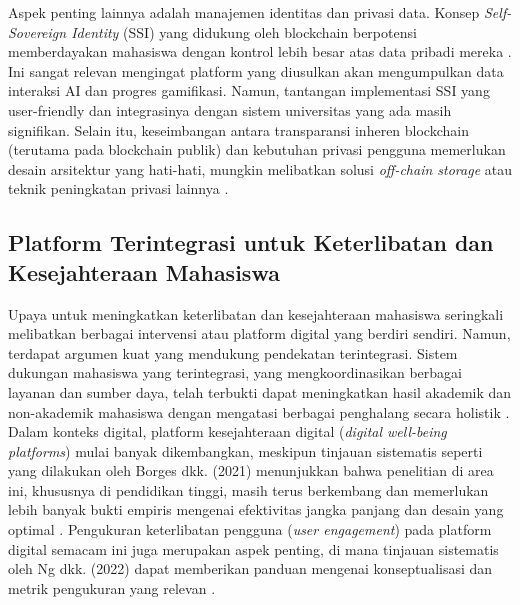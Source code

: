 Aspek penting lainnya adalah manajemen identitas dan privasi data. Konsep \textit{Self-Sovereign Identity} (SSI) yang didukung oleh blockchain berpotensi memberdayakan mahasiswa dengan kontrol lebih besar atas data pribadi mereka \cite{survey_blockchain_privacy_2024}. Ini sangat relevan mengingat platform yang diusulkan akan mengumpulkan data interaksi AI dan progres gamifikasi. Namun, tantangan implementasi SSI yang user-friendly dan integrasinya dengan sistem universitas yang ada masih signifikan. Selain itu, keseimbangan antara transparansi inheren blockchain (terutama pada blockchain publik) dan kebutuhan privasi pengguna memerlukan desain arsitektur yang hati-hati, mungkin melibatkan solusi \textit{off-chain storage} atau teknik peningkatan privasi lainnya \cite{survey_blockchain_privacy_2024}.


\subsection{Platform Terintegrasi untuk Keterlibatan dan Kesejahteraan Mahasiswa}
\label{subsec:platform_terintegrasi_tinjauan}

Upaya untuk meningkatkan keterlibatan dan kesejahteraan mahasiswa seringkali melibatkan berbagai intervensi atau platform digital yang berdiri sendiri. Namun, terdapat argumen kuat yang mendukung pendekatan terintegrasi. Sistem dukungan mahasiswa yang terintegrasi, yang mengkoordinasikan berbagai layanan dan sumber daya, telah terbukti dapat meningkatkan hasil akademik dan non-akademik mahasiswa dengan mengatasi berbagai penghalang secara holistik \cite{child_trends_integrated_student_support_2019}. Dalam konteks digital, platform kesejahteraan digital (\textit{digital well-being platforms}) mulai banyak dikembangkan, meskipun tinjauan sistematis seperti yang dilakukan oleh Borges dkk. (2021) menunjukkan bahwa penelitian di area ini, khususnya di pendidikan tinggi, masih terus berkembang dan memerlukan lebih banyak bukti empiris mengenai efektivitas jangka panjang dan desain yang optimal \cite{borges_digital_wellbeing_higher_ed_2021}. Pengukuran keterlibatan pengguna (\textit{user engagement}) pada platform digital semacam ini juga merupakan aspek penting, di mana tinjauan sistematis oleh Ng dkk. (2022) dapat memberikan panduan mengenai konseptualisasi dan metrik pengukuran yang relevan \cite{ng_user_engagement_systematic_review_2022}.

